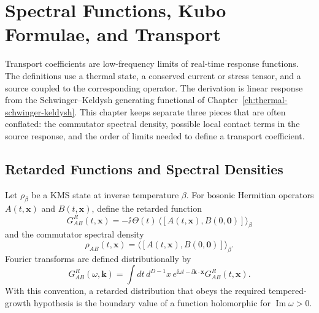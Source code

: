 \chapter{Spectral Functions, Kubo Formulae, and Transport}
\label{ch:thermal-spectral-kubo-transport}

\ConventionsRealTime

Transport coefficients are low-frequency limits of real-time response
functions.  The definitions use a thermal state, a conserved current or
stress tensor, and a source coupled to the corresponding operator.  The
derivation is linear response from the Schwinger--Keldysh generating
functional of Chapter~\ref{ch:thermal-schwinger-keldysh}.  This chapter
keeps separate three pieces that are often conflated: the commutator
spectral density, possible local contact terms in the source response, and
the order of limits needed to define a transport coefficient.

\section{Retarded Functions and Spectral Densities}

Let \(\rho_\beta\) be a KMS state at inverse temperature \(\beta\).  For
bosonic Hermitian operators \(A(t,\mathbf x)\) and \(B(t,\mathbf x)\), define
the retarded function
\begin{equation}
  G^R_{AB}(t,\mathbf x)
  =
  -\ii\,\Theta(t)\,
  \langle [A(t,\mathbf x),B(0,\mathbf 0)]\rangle_\beta
  \label{eq:kubo-retarded-definition}
\end{equation}
and the commutator spectral density
\begin{equation}
  \rho_{AB}(t,\mathbf x)
  =
  \langle [A(t,\mathbf x),B(0,\mathbf 0)]\rangle_\beta .
  \label{eq:kubo-commutator-spectral-density}
\end{equation}
Fourier transforms are defined distributionally by
\begin{equation}
  G^R_{AB}(\omega,\mathbf k)
  =
  \int dt\,d^{D-1}x\,
  e^{\ii\omega t-\ii\mathbf k\cdot\mathbf x}
  G^R_{AB}(t,\mathbf x).
  \label{eq:kubo-fourier-convention}
\end{equation}
With this convention, a retarded distribution that obeys the required
tempered-growth hypothesis is the boundary value of a function holomorphic
for \(\operatorname{Im}\omega>0\).

